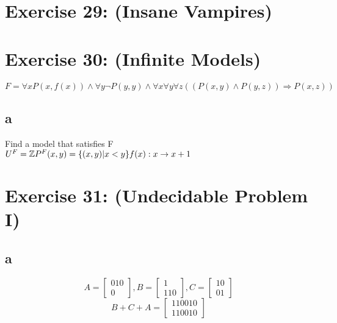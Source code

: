 \documentclass[12pt]{article}
\newcommand{\Z}{\mathbb Z}
\begin{document}
 

\rhead{\today}


\section*{Exercise 29:  (Insane Vampires)}

\section*{Exercise 30: (Infinite Models)}
$ F = \forall x P(x,f(x)) \land \forall y \lnot P(y,y) \land \forall x \forall y \forall z ((P(x,y)\land P(y,z)) \Rightarrow P(x,z))$
\subsection*{a}
Find a model that satisfies F\\
$U^F = \Z\\
P^F(x,y) = \{ (x,y) | x < y\}\\
f(x): x \rightarrow x+1$

\section*{Exercise 31: (Undecidable Problem I)}
\subsection*{a}
\[
A =\begin{bmatrix}
0 1 0\\
  0  
\end{bmatrix}, 
B = \begin{bmatrix}
  1\\
1 1 0  
\end{bmatrix},
C = \begin{bmatrix}
1 0\\
0 1
\end{bmatrix}
\]
\[
B+C+A =\begin{bmatrix}
  1    1 0 0 1 0\\
1 1 0  0 1    0
\end{bmatrix}
\]
\end{document}
